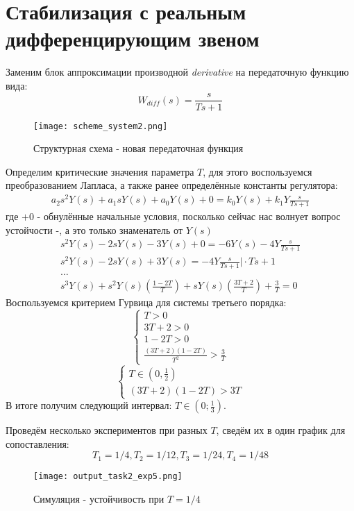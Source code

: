 \chapter{Стабилизация с реальным дифференцирующим звеном}
\label{ch:chap2}


Заменим блок аппроксимации производной \textit{derivative} на передаточную функцию вида:
$$
W_{diff}(s) = \frac{s}{Ts+1}
$$
\begin{figure}[ht]
  \centering
  \texttt{[image: scheme\_system2.png]}
\caption{Структурная схема - новая передаточная функция}
\end{figure}

Определим критические значения параметра $T$, для этого воспользуемся преобразованием Лапласа, а также ранее определённые константы регулятора:
$$
\begin{aligned}
  a_2s^2Y(s) + a_1sY(s)+a_0Y(s) + 0 = k_0Y(s) + k_1Y\frac{s}{Ts+1} 
\end{aligned}
$$
где $+0$ - обнулённые начальные условия, посколько сейчас нас волнует вопрос устойчости -, а это только знаменатель от $Y(s)$
$$
\begin{aligned}
  s^2Y(s) -2sY(s)-3Y(s) + 0 = -6Y(s) -4Y\frac{s}{Ts+1}  \\
  s^2Y(s) -2sY(s)+3Y(s) = -4Y\frac{s}{Ts+1} \bigg|\cdot Ts+1 \\
  \dots \\
  s^3Y(s) + s^2Y(s)(\frac{1-2T}{T}) +sY(s)(\frac{3T+2}{T}) + \frac{3}{T} = 0
\end{aligned}
$$
Воспользуемся критерием Гурвица для системы третьего порядка:
$$
\begin{cases}
  T>0 \\
  3T+2 > 0 \\
  1-2T > 0 \\
  \frac{(3T+2)(1-2T)}{T^2} > \frac{3}{T}
\end{cases}
$$
$$
\begin{cases}
  T \in (0, \frac{1}{2}) \\
  (3T+2)(1-2T) > 3T
\end{cases}
$$
В итоге получим следующий интервал: $T\in(0;\frac{1}{3})$.

Проведём несколько экспериментов при разных $T$, сведём их в один график для сопоставления:
$$
T_1 = 1/4, T_2 = 1/12, T_3 = 1/24, T_4 = 1/48
$$
\begin{figure}[ht]
  \centering
  \texttt{[image: output\_task2\_exp5.png]}
\caption{Симуляция - устойчивость при $T=1/4$}
\end{figure}

